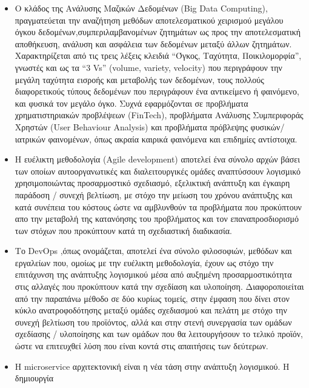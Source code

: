 \documentclass{article}
\begin{document}
\begin{itemize}
\item Ο κλάδος της Ανάλυσης Μαζικών Δεδομένων (Big
Data Computing), πραγματεύεται την αναζήτηση μεθόδων
αποτελεσματικού χειρισμού μεγάλου όγκου δεδομένων,συμπεριλαμβανομένων
ζητημάτων ως προς την αποτελεσματική αποθήκευση, ανάλυση και ασφάλεια των
δεδομένων μεταξύ άλλων ζητημάτων. Χαρακτηρίζεται από τις τρεις λέξεις
κλειδιά “Όγκος, Ταχύτητα, Ποικιλομορφία”, γνωστές και ως τα “3
Vs” (volume, variety, velocity)
που περιγράφουν την μεγάλη ταχύτητα εισροής και
μεταβολής των δεδομένων, τους πολλούς διαφορετικούς τύπους δεδομένων που
περιγράφουν ένα αντικείμενο ή φαινόμενο, και φυσικά τον μεγάλο όγκο. Συχνά
εφαρμόζονται σε προβλήματα χρηματιστηριακών προβλέψεων
(FinTech), προβλήματα
Ανάλυσης Συμπεριφοράς Χρηστών (User Behaviour
Analysis) και προβλήματα πρόβλεψης φυσικών/ιατρικών
φαινομένων, όπως ακραία καιρικά φαινόμενα και επιδημίες αντίστοιχα.
\item Η ευέλικτη μεθοδολογία (Agile development)
αποτελεί ένα σύνολο αρχών βάσει των οποίων
αυτοοργανωτικές και διαλειτουργικές ομάδες αναπτύσσουν λογισμικό
χρησιμοποιώντας προσαρμοστικό σχεδιασμό, εξελικτική ανάπτυξη και έγκαιρη
παράδοση / συνεχή βελτίωση, με στόχο την μείωση του χρόνου ανάπτυξης και
κατά συνέπεια του κόστους ώστε να αμβλυνθούν τα προβλήματα που προκύπτουν
απο την μεταβολή της κατανόησης του προβλήματος και τον επαναπροσδιορισμό
των στόχων που προκύπτουν κατά τη σχεδιαστική διαδικασία.
\item Το DevOps ,όπως
ονομάζεται, αποτελεί ένα σύνολο φιλοσοφιών, μεθόδων και εργαλείων που,
ομοίως με την ευέλικτη μεθοδολογία, έχουν ως στόχο την επιτάχυνση της
ανάπτυξης λογισμικού μέσα από αυξημένη προσαρμοστικότητα στις αλλαγές που
προκύπτουν κατά την σχεδίαση και υλοποίηση. Διαφοροποιείται από την
παραπάνω μέθοδο σε δύο κυρίως τομείς, στην έμφαση που δίνει στον κύκλο
ανατροφοδότησης μεταξύ ομάδες σχεδιασμού και πελάτη με στόχο την συνεχή
βελτίωση του προϊόντος, αλλά και στην στενή συνεργασία των ομάδων
σχεδίασης / υλοποίησης και των ομάδων που θα λειτουργήσουν το τελικό
προϊόν, ώστε να επιτευχθεί λύση που είναι κοντά στις απαιτήσεις των
δεύτερων.
\item Η microservice
αρχιτεκτονική είναι η νέα τάση στην ανάπτυξη λογισμικού. Η δημιουργία

\end{itemize}
\end{document}
